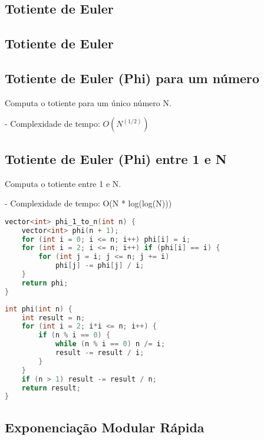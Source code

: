 \documentclass[11pt, a4paper, twoside]{article}
\begin{document}
\subsection{Totiente de Euler}

\subsection{Totiente de Euler}



\subsection{Totiente de Euler (Phi) para um número}

Computa o totiente para um único número N.

- Complexidade de tempo: $O(N^(1/2))$

\subsection{Totiente de Euler (Phi) entre 1 e N}

Computa o totiente entre 1 e N.

- Complexidade de tempo: O(N * log(log(N)))

\begin{multicols}{2}
\begin{lstlisting}[language=C++]
vector<int> phi_1_to_n(int n) {
    vector<int> phi(n + 1);
    for (int i = 0; i <= n; i++) phi[i] = i;
    for (int i = 2; i <= n; i++) if (phi[i] == i) {
        for (int j = i; j <= n; j += i)
            phi[j] -= phi[j] / i;
    }
    return phi;
}
\end{lstlisting}
\end{multicols}

\begin{multicols}{2}
\begin{lstlisting}[language=C++]
int phi(int n) {
    int result = n;
    for (int i = 2; i*i <= n; i++) {
        if (n % i == 0) {
            while (n % i == 0) n /= i;
            result -= result / i;
        }
    }
    if (n > 1) result -= result / n;
    return result;
}
\end{lstlisting}
\end{multicols}

\subsection{Exponenciação Modular Rápida}
\end{document}
